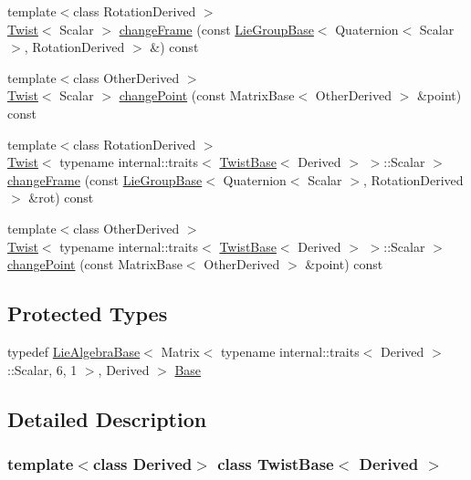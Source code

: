 \begin{DoxyCompactItemize}
\item 
{\footnotesize template$<$class Rotation\+Derived $>$ }\\\hyperlink{class_twist}{Twist}$<$ Scalar $>$ \hyperlink{class_twist_base_a6c88583539f3cd30d68576ea4d707525}{change\+Frame} (const \hyperlink{class_lie_group_base}{Lie\+Group\+Base}$<$ Quaternion$<$ Scalar $>$, Rotation\+Derived $>$ \&) const
\item 
{\footnotesize template$<$class Other\+Derived $>$ }\\\hyperlink{class_twist}{Twist}$<$ Scalar $>$ \hyperlink{class_twist_base_a44ecd77777c54f0f632d6a89951c5884}{change\+Point} (const Matrix\+Base$<$ Other\+Derived $>$ \&point) const
\item 
{\footnotesize template$<$class Rotation\+Derived $>$ }\\\hyperlink{class_twist}{Twist}$<$ typename internal\+::traits$<$ \hyperlink{class_twist_base}{Twist\+Base}$<$ Derived $>$ $>$\+::Scalar $>$ \hyperlink{class_twist_base_a6e0074ec6e0621dc603d6eca78b4d9f2}{change\+Frame} (const \hyperlink{class_lie_group_base}{Lie\+Group\+Base}$<$ Quaternion$<$ Scalar $>$, Rotation\+Derived $>$ \&rot) const
\item 
{\footnotesize template$<$class Other\+Derived $>$ }\\\hyperlink{class_twist}{Twist}$<$ typename internal\+::traits$<$ \hyperlink{class_twist_base}{Twist\+Base}$<$ Derived $>$ $>$\+::Scalar $>$ \hyperlink{class_twist_base_a9cc4e024b42a1164268d8066b006289c}{change\+Point} (const Matrix\+Base$<$ Other\+Derived $>$ \&point) const
\end{DoxyCompactItemize}
\subsection*{Protected Types}
\begin{DoxyCompactItemize}
\item 
typedef \hyperlink{class_lie_algebra_base}{Lie\+Algebra\+Base}$<$ Matrix$<$ typename internal\+::traits$<$ Derived $>$\+::Scalar, 6, 1 $>$, Derived $>$ \hyperlink{class_twist_base_a5855f503803bbb643e270d0cc7360c1f}{Base}
\end{DoxyCompactItemize}


\subsection{Detailed Description}
\subsubsection*{template$<$class Derived$>$\newline
class Twist\+Base$<$ Derived $>$}

